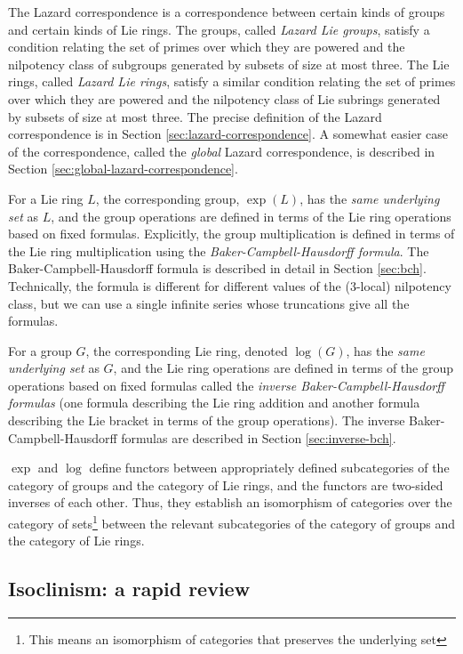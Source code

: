 \documentclass{ucetd}
\begin{document}
The Lazard correspondence is a correspondence between certain kinds of
groups and certain kinds of Lie rings. The groups, called {\em Lazard
  Lie groups}, satisfy a condition relating the set of primes over
which they are powered and the nilpotency class of subgroups generated
by subsets of size at most three. The Lie rings, called {\em Lazard
  Lie rings}, satisfy a similar condition relating the set of primes
over which they are powered and the nilpotency class of Lie subrings
generated by subsets of size at most three. The precise definition of
the Lazard correspondence is in Section
\ref{sec:lazard-correspondence}. A somewhat easier case of the
correspondence, called the {\em global} Lazard correspondence, is
described in Section \ref{sec:global-lazard-correspondence}.

For a Lie ring $L$, the corresponding group, $\exp(L)$, has the {\em
  same underlying set} as $L$, and the group operations are defined in
terms of the Lie ring operations based on fixed formulas. Explicitly,
the group multiplication is defined in terms of the Lie ring
multiplication using the {\em Baker-Campbell-Hausdorff formula}. The
Baker-Campbell-Hausdorff formula is described in detail in Section
\ref{sec:bch}. Technically, the formula is different for different
values of the ($3$-local) nilpotency class, but we can use a single
infinite series whose truncations give all the formulas.

For a group $G$, the corresponding Lie ring, denoted $\log(G)$, has
the {\em same underlying set} as $G$, and the Lie ring operations are
defined in terms of the group operations based on fixed formulas
called the {\em inverse Baker-Campbell-Hausdorff formulas} (one
formula describing the Lie ring addition and another formula
describing the Lie bracket in terms of the group operations). The
inverse Baker-Campbell-Hausdorff formulas are described in Section
\ref{sec:inverse-bch}.

$\exp$ and $\log$ define functors between appropriately defined
subcategories of the category of groups and the category of Lie rings,
and the functors are two-sided inverses of each other. Thus, they
establish an isomorphism of categories over the category of
sets\footnote{This means an isomorphism of categories that preserves
  the underlying set} between the relevant subcategories of the
category of groups and the category of Lie rings.

\subsection{Isoclinism: a rapid review}
\end{document}
